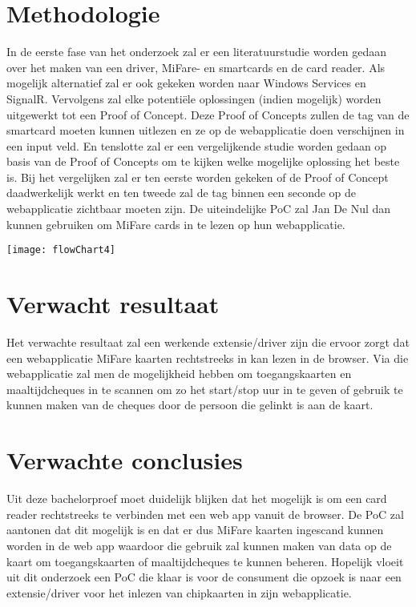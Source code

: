 \section{Methodologie}%
\label{sec:methodologie}

In de eerste fase van het onderzoek zal er een literatuurstudie worden gedaan over het maken van een driver, MiFare- en smartcards en de card reader. Als mogelijk alternatief zal er ook gekeken worden naar Windows Services en SignalR. Vervolgens zal elke potentiële oplossingen (indien mogelijk) worden uitgewerkt tot een Proof of Concept. Deze Proof of Concepts zullen de tag van de smartcard moeten kunnen uitlezen en ze op de webapplicatie doen verschijnen in een input veld. En tenslotte zal er een vergelijkende studie worden gedaan op basis van de Proof of Concepts om te kijken welke mogelijke oplossing het beste is. Bij het vergelijken zal er ten eerste worden gekeken of de Proof of Concept daadwerkelijk werkt en ten tweede zal de tag binnen een seconde op de webapplicatie zichtbaar moeten zijn. De uiteindelijke PoC zal Jan De Nul dan kunnen gebruiken om MiFare cards in te lezen op hun webapplicatie. 

\begin{center}
    \texttt{[image: flowChart4]}
\end{center}

\section{Verwacht resultaat}%
\label{sec:verwachte_resultaten}

Het verwachte resultaat zal een werkende extensie/driver zijn die ervoor zorgt dat een webapplicatie MiFare kaarten rechtstreeks in kan lezen in de browser. Via die webapplicatie zal men de mogelijkheid hebben om toegangskaarten en maaltijdcheques in te scannen om zo het start/stop uur in te geven of gebruik te kunnen maken van de cheques door de persoon die gelinkt is aan de kaart.

\section{Verwachte conclusies}%
\label{sec:Verwachte_conclusies}

Uit deze bachelorproef moet duidelijk blijken dat het mogelijk is om een card reader rechtstreeks te verbinden met een web app vanuit de browser. De PoC zal aantonen dat dit mogelijk is en dat er dus MiFare kaarten ingescand kunnen worden in de web app waardoor die gebruik zal kunnen maken van data op de kaart om toegangskaarten of maaltijdcheques te kunnen beheren. Hopelijk vloeit uit dit onderzoek een PoC die klaar is voor de consument die opzoek is naar een extensie/driver voor het inlezen van chipkaarten in zijn webapplicatie.